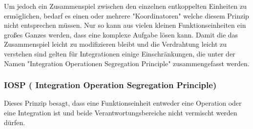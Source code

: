 Um jedoch ein Zusammenspiel zwischen den einzelnen entkoppelten Einheiten zu ermöglichen, bedarf es einen oder
mehrere "Koordinatoren" welche diesem Prinzip nicht entsprechen müssen.
Nur so kann aus vielen kleinen Funktionseinheiten ein großes Ganzes werden, dass eine komplexe Aufgabe lösen kann.
Damit die das Zusammenspiel leicht zu modifizieren bleibt und die Verdrahtung
leicht zu verstehen sind gelten für Integrationen einige Einschränkungen, die
unter der Namen "Integration Operationen Segregation Principle" zusammengefasst
werden.



\subsubsection{IOSP ( Integration Operation Segregation Principle)}

Dieses Prinzip besagt, dass eine Funktionseinheit entweder eine Operation oder eine Integration ist und beide
Verantwortungsbereiche nicht vermischt werden dürfen.

